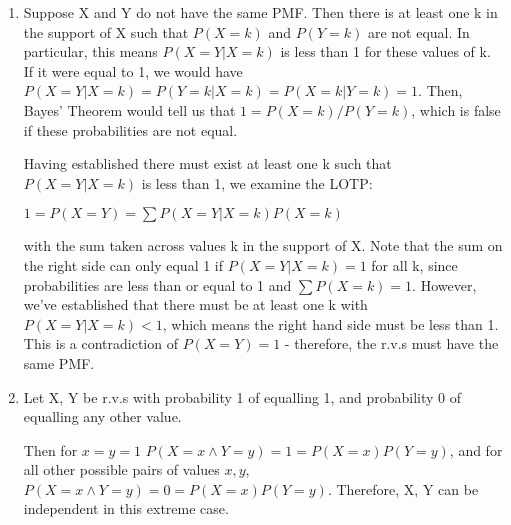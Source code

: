\begin{enumerate}[label=(\alph*)]
\item Suppose X and Y do not have the same PMF. Then there is at least one k in the support of X such that $P(X=k)$ and $P(Y=k)$ are not equal. In particular, this means $P(X=Y| X=k)$ is less than 1 for these values of k. If it were equal to 1, we would have $P(X=Y|X=k) = P(Y=k |X=k) = P(X=k|Y=k) = 1$. Then, Bayes' Theorem would tell us that $1 = P(X=k)/P(Y=k)$, which is false if these probabilities are not equal. 

Having established there must exist at least one k such that $P(X=Y| X=k)$ is less than 1, we examine the LOTP:

$1 = P(X=Y) = \sum P(X=Y | X=k)P(X=k)$

with the sum taken across values k in the support of X. Note that the sum on the right side can only equal 1 if $P(X=Y|X=k)=1$ for all k, since probabilities are less than or equal to 1 and $\sum P(X=k) = 1$. However, we've established that there must be at least one k with $P(X=Y|X=k)<1$, which means the right hand side must be less than 1. This is a contradiction of $P(X=Y)=1$ - therefore, the r.v.s must have the same PMF. 


\item Let X, Y be r.v.s with probability 1 of equalling 1, and probability 0 of equalling any other value.

Then for $x=y=1$ $P(X = x \wedge Y = y) = 1 = P(X=x)P(Y=y)$, and for all other possible pairs of values $x,y$, $P(X=x \wedge Y = y) = 0 = P(X=x)P(Y=y)$. Therefore, X, Y can be independent in this extreme case.
\end{enumerate}
